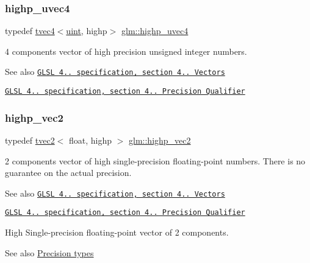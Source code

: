 \subsubsection{\texorpdfstring{highp\+\_\+uvec4}{highp\_uvec4}}
{\footnotesize\ttfamily typedef \hyperlink{structglm_1_1tvec4}{tvec4}$<$\hyperlink{group__core__precision_ga4fd29415871152bfb5abd588334147c8}{uint}, highp$>$ \hyperlink{group__core__precision_gaced82ea2e726f079d4d72cf180a75b8b}{glm\+::highp\+\_\+uvec4}}

4 components vector of high precision unsigned integer numbers.

\begin{DoxySeeAlso}{See also}
\href{http://www.opengl.org/registry/doc/GLSLangSpec.4.20.8.pdf}{\tt G\+L\+SL 4.. specification, section 4.. Vectors} 

\href{http://www.opengl.org/registry/doc/GLSLangSpec.4.20.8.pdf}{\tt G\+L\+SL 4.. specification, section 4.. Precision Qualifier} 
\end{DoxySeeAlso}
\mbox{\label{group__core__precision_ga84532f0e0c7e2af99edd65dc182aba51}} 
\subsubsection{\texorpdfstring{highp\+\_\+vec2}{highp\_vec2}}
{\footnotesize\ttfamily typedef \hyperlink{structglm_1_1tvec2}{tvec2}$<$ float, highp $>$ \hyperlink{group__core__precision_ga84532f0e0c7e2af99edd65dc182aba51}{glm\+::highp\+\_\+vec2}}

2 components vector of high single-\/precision floating-\/point numbers. There is no guarantee on the actual precision.

\begin{DoxySeeAlso}{See also}
\href{http://www.opengl.org/registry/doc/GLSLangSpec.4.20.8.pdf}{\tt G\+L\+SL 4.. specification, section 4.. Vectors} 

\href{http://www.opengl.org/registry/doc/GLSLangSpec.4.20.8.pdf}{\tt G\+L\+SL 4.. specification, section 4.. Precision Qualifier}
\end{DoxySeeAlso}
High Single-\/precision floating-\/point vector of 2 components. \begin{DoxySeeAlso}{See also}
\hyperlink{group__core__precision}{Precision types} 
\end{DoxySeeAlso}
\mbox{\label{group__core__precision_ga1ef07d2502ea09b1e63998813a3d4330}} 
